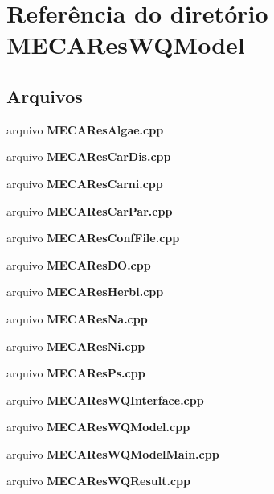 \section{Referência do diretório M\+E\+C\+A\+Res\+W\+Q\+Model}
\label{dir_3bc2e8d248e74693e45838fbadf18fb3}
\subsection*{Arquivos}
\begin{DoxyCompactItemize}
\item 
arquivo {\bf M\+E\+C\+A\+Res\+Algae.\+cpp}
\item 
arquivo {\bf M\+E\+C\+A\+Res\+Car\+Dis.\+cpp}
\item 
arquivo {\bf M\+E\+C\+A\+Res\+Carni.\+cpp}
\item 
arquivo {\bf M\+E\+C\+A\+Res\+Car\+Par.\+cpp}
\item 
arquivo {\bf M\+E\+C\+A\+Res\+Conf\+File.\+cpp}
\item 
arquivo {\bf M\+E\+C\+A\+Res\+D\+O.\+cpp}
\item 
arquivo {\bf M\+E\+C\+A\+Res\+Herbi.\+cpp}
\item 
arquivo {\bf M\+E\+C\+A\+Res\+Na.\+cpp}
\item 
arquivo {\bf M\+E\+C\+A\+Res\+Ni.\+cpp}
\item 
arquivo {\bf M\+E\+C\+A\+Res\+Ps.\+cpp}
\item 
arquivo {\bf M\+E\+C\+A\+Res\+W\+Q\+Interface.\+cpp}
\item 
arquivo {\bf M\+E\+C\+A\+Res\+W\+Q\+Model.\+cpp}
\item 
arquivo {\bf M\+E\+C\+A\+Res\+W\+Q\+Model\+Main.\+cpp}
\item 
arquivo {\bf M\+E\+C\+A\+Res\+W\+Q\+Result.\+cpp}
\end{DoxyCompactItemize}
